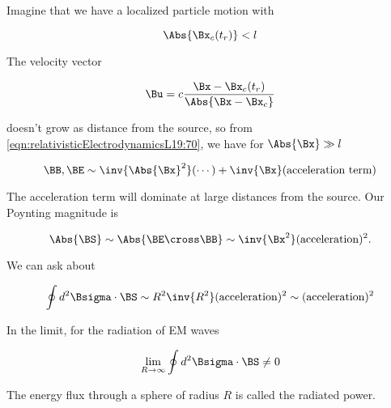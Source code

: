 Imagine that we have a localized particle motion with

\begin{equation}\label{eqn:relativisticElectrodynamicsL19:300}
\Abs{\Bx_c(t_r)} < l
\end{equation}

The velocity vector 

\begin{equation}\label{eqn:relativisticElectrodynamicsL19:320}
\Bu = c \frac{\Bx - \Bx_c(t_r)}{\Abs{\Bx - \Bx_c}}
\end{equation}

doesn't grow as distance from the source, so from \ref{eqn:relativisticElectrodynamicsL19:70}, we have for $\Abs{\Bx} \gg l$

\begin{equation}\label{eqn:relativisticElectrodynamicsL19:340}
\BB, \BE \sim \inv{\Abs{\Bx}^2}(\cdots) + \inv{\Bx}(\text{acceleration term})
\end{equation}

The acceleration term will dominate at large distances from the source.  Our Poynting magnitude is

\begin{equation}\label{eqn:relativisticElectrodynamicsL19:360}
\Abs{\BS} \sim \Abs{\BE \cross \BB} \sim \inv{\Bx^2} (\text{acceleration})^2.
\end{equation}

We can ask about 

\begin{equation}\label{eqn:relativisticElectrodynamicsL19:380}
\oint d^2 \Bsigma \cdot \BS \sim R^2 \inv{R^2} (\text{acceleration})^2 \sim (\text{acceleration})^2 
\end{equation}

In the limit, for the radiation of EM waves

\begin{equation}\label{eqn:relativisticElectrodynamicsL19:400}
\lim_{R\rightarrow \infty} \oint d^2 \Bsigma \cdot \BS \ne 0
\end{equation}

The energy flux through a sphere of radius $R$ is called the radiated power.

\EndArticle

